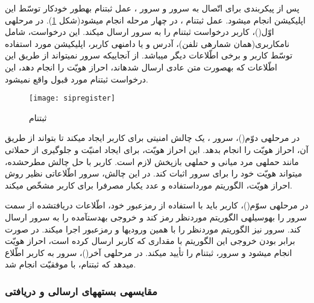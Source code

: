 پس از پیکربندی  برای اتّصال به سرور  و سرور ، عمل ثبت\nf نام به\nf طور خودکار توسّط این اپلیکیشن انجام می\nf شود. عمل ثبت\nf نام ، در چهار مرحله انجام می\nf شود(شکل \ref{sipregister}). در مرحله\nf ی اوّل()، کاربر درخواست ثبت\nf نام  را به سرور  ارسال می\nf کند. این درخواست، شامل نام\nf کاربری(همان شماره\nf ی تلفن)، آدرس  و یا دامنه\nf ی کاربر، اپلیکیشن مورد استفاده توسّط کاربر و برخی اطّلاعات دیگر می\nf باشد. از آنجایی\nf که سرور نمی\nf تواند از طریق این اطّلاعات که به\nf صورت متن عادی ارسال شده\nf اند، احراز هویّت را انجام دهد، این درخواست ثبت\nf نام مورد قبول واقع نمی\nf شود\cite{rfcsip}.


\begin{figure}[h]
\centering
\texttt{[image: sipregister]}
\caption{ثبت\nf نام }
\label{sipregister}
\end{figure}

در مرحله\nf ی دوّم()، سرور ،  یک چالش امنیتی برای کاربر ایجاد می\nf کند تا بتواند از طریق آن، احراز هویّت را انجام بدهد. این احراز هویّت، برای ایجاد امنیّت و جلوگیری از حملاتی مانند حمله\nf ی مرد میانی و حمله\nf ی بازپخش لازم است. کاربر با حل چالش مطرح\nf شده، می\nf تواند هویّت خود را برای سرور اثبات کند. در این چالش، سرور  اطّلاعاتی نظیر روش احراز هویّت، الگوریتم مورداستفاده و عدد یک\nf بار مصرفرا برای کاربر مشخّص می\nf کند\cite{rfcsip}. 


در مرحله\nf ی سوّم()، کاربر باید با استفاده از رمزعبور خود، اطّلاعات دریافت\nf شده از سمت سرور را به\nf وسیله\nf ی الگوریتم موردنظر رمز کند و خروجی به\nf دست\nf آمده را به سرور ارسال کند. سرور نیز الگوریتم موردنظر را با همین ورودی\nf ها و رمزعبور اجرا می\nf کند. در صورت برابر بودن خروجی این الگوریتم با مقداری که کاربر ارسال کرده است، احراز هویّت انجام می\nf شود و سرور، ثبت\nf نام  را تأیید می\nf کند. در مرحله\nf ی آخر()، سرور به کاربر اطّلاع می\nf دهد که ثبت\nf نام، با موفقیّت انجام شد\cite{rfcsip}.


\subsubsection{مقایسه\nf ی بسته\nf های ارسالی و دریافتی}

